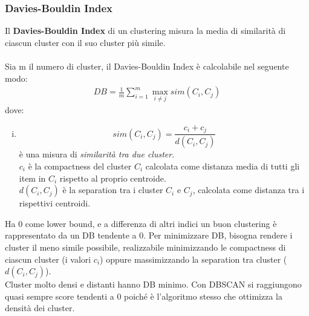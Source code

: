 \subsubsection{Davies-Bouldin Index}
Il \textbf{Davies-Bouldin Index} di un clustering misura la media di similarità di ciascun cluster con il suo cluster più simile.\\
\\
Sia m il numero di cluster, il Davies-Bouldin Index è calcolabile nel seguente modo:
\begin{align}
	DB = \frac{1}{m}\sum_{i=1}^{m}\max_{i \ne j}sim(C_i, C_j)
\end{align}
dove:
\begin{enumerate}[(i)]
	\item $$ sim(C_i, C_j) =  \frac{c_i + c_j}{d(C_i, C_j)}$$ è una misura di \textit{similarità tra due cluster}.\\
	$c_i$ è la compactness del cluster $C_i$ calcolata come distanza media di tutti gli item in $C_i$ rispetto al proprio centroide.\\
	$d(C_i, C_j)$ è la separation tra i cluster $C_i$ e $C_j$, calcolata come distanza tra i rispettivi centroidi.
\end{enumerate}
Ha 0 come lower bound, e a differenza di altri indici un buon clustering è rappresentato da un DB tendente a 0. Per minimizzare DB, bisogna rendere i cluster il meno simile possibile, realizzabile minimizzando le compactness di ciascun cluster (i valori $c_i$) oppure massimizzando la separation tra cluster ($d(C_i, C_j)$).\\
Cluster molto densi e distanti hanno DB minimo. Con DBSCAN si raggiungono quasi sempre score tendenti a 0 poiché è l'algoritmo stesso che ottimizza la densità dei cluster.

